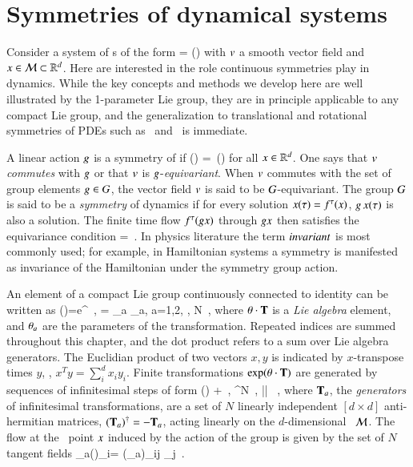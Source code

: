 \documentclass[preprint,number,sort&compress]{elsarticle}
\begin{document}
\section{\label{s:symDyn} Symmetries of dynamical systems}

Consider a system of \ode s of the form
\beq
	\dot{\ssp} = \vf(\ssp)
	\label{eq:difeq}
\eeq
with $v$ a smooth vector field and $x\in{\cal M}\subset\mathbb{R}^{d}$.
Here are interested in the role continuous symmetries
play in dynamics.
While the key concepts and methods we develop here are well
illustrated by the 1-parameter Lie  group, they are in
principle applicable to any compact Lie group, and the
generalization to translational and rotational symmetries of
PDEs such as \KS\ and \pCf\ is immediate.

A linear action $g$ is a symmetry of
 if
\beq
	\vf(\LieEl \ssp) =\LieEl \, \vf(\ssp)
	\label{eq:equiv}
\eeq
for all $x\in\mathbb{R}^{d}$. One  says that $v$ \emph{commutes}
with $g$ or that $v$ is $g$-\emph{equi\-vari\-ant}.
When $v$ commutes with the set of group elements
$g\in G$, the vector field $v$ is said to be
$G$-equi\-vari\-ant. The group $G$ is said to be a {\em
symmetry} of dynamics if for every solution $x(\tau)=
{f^{\tau}(x)}$, $g \, x(\tau)$ is also a solution. The finite
time flow ${f^{\tau}(g x)}$ through $g x$ then
satisfies the equivariance condition
\beq
\flow{\tau}{\LieEl \ssp}=\LieEl\flow{\tau}{\ssp}
\,.
In physics literature the term $in\-vari\-ant$ is most commonly
used; for example, in Hamiltonian systems a symmetry is
manifested as invariance of the Hamiltonian under the
symmetry group action.

An element of a compact Lie group
continuously connected to identity can be written as
\beq
\LieEl(\gSpace)=e^{\gSpace \cdot \Lg }
	\,,\qquad
\gSpace \cdot \Lg  = \sum \gSpace_a \Lg_a,\; a=1,2, \cdots, N
\,,
where
${\bf \theta} \cdot \mathbf{T}$
is a {\em Lie algebra} element,  and ${\bf \theta}_a$ are the parameters
of the transformation. Repeated indices are summed throughout this
chapter, and the dot product refers to a sum over
Lie algebra generators. The Euclidian product of two vectors
$x,y$ is indicated by $x$-transpose times $y$, \ie,
$x^T y = \sum_i^d x_i y_i$.
Finite transformations $ \exp({\bf \theta} \cdot {\ensuremath{\mathbf{T}}}) $ are
generated by sequences of infinitesimal steps of form
\beq
\LieEl(\delta\gSpace)  + \delta \gSpace \cdot \Lg
    \,,\quad
\delta\gSpace \in \reals^N
    \,,\quad
|\delta \gSpace| 
    \, ,
where $\mathbf{T}_a$, the {\em generators} of infinitesimal
transformations, are a set of $N$ linearly independent
$[d\!\times\!d]$ anti-hermitian matrices, $(\mathbf{T}_a)^\dagger =
- \mathbf{T}_a$, acting linearly on the $d$-dim\-ens\-ion\-al \statesp\
${\cal M}$.
The flow
at the \statesp\ point $x$ induced by the action of the group
is given by the set of $N$ tangent fields
\beq
\groupTan_a(\ssp)_{i}= (\Lg_a){}_{ij} \ssp_j
\,.
\end{document}
